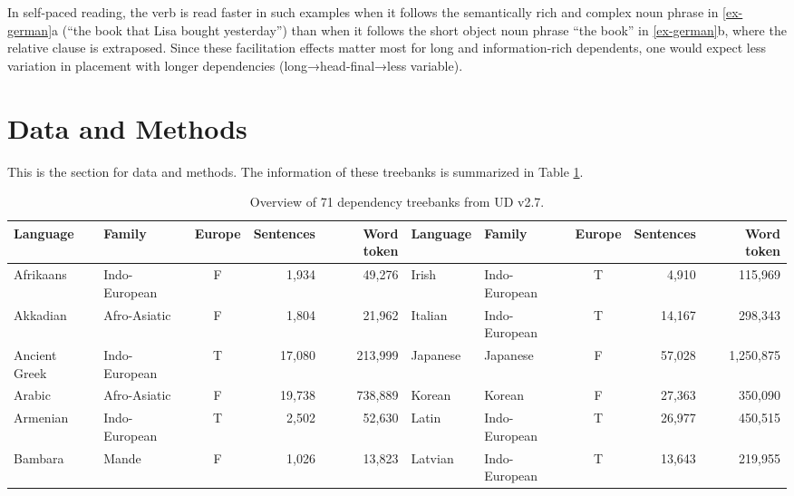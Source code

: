 \documentclass[10pt,a4paper,]{article}
\begin{document}
In self-paced reading, the verb is read faster in such examples when it
follows the semantically rich and complex noun phrase in
\ref{ex-german}a (``the book that Lisa bought yesterday'') than when it
follows the short object noun phrase ``the book'' in \ref{ex-german}b,
where the relative clause is extraposed. Since these facilitation
effects matter most for long and information-rich dependents, one would
expect less variation in placement with longer dependencies
(long→head-final→less variable).

\hypertarget{data-and-methods}{%
\section{Data and Methods}\label{data-and-methods}}

This is the section for data and methods. The information of these
treebanks is summarized in Table \ref{tab:UD-data}.

\begin{center}
\setlength\tabcolsep{2pt}
\begin{ThreePartTable}
\footnotesize
\begin{longtable}[h]{llcrr|llcrr}
\caption{Overview of 71 dependency treebanks from UD v2.7.\label{tab:UD-data}} \\
\hline
\endfirsthead
\toprule
\endhead
\vspace{-0.05cm}
Language & Family & Europe & Sentences & Word token & Language & Family & Europe & Sentences & Word token\\
\midrule
Afrikaans & Indo-European & F & 1,934 & 49,276 & Irish & Indo-European & T & 4,910 & 115,969\\
Akkadian & Afro-Asiatic & F & 1,804 & 21,962 & Italian & Indo-European & T & 14,167 & 298,343\\
Ancient Greek & Indo-European & T & 17,080 & 213,999 & Japanese & Japanese & F & 57,028 & 1,250,875\\
Arabic & Afro-Asiatic & F & 19,738 & 738,889 & Korean & Korean & F & 27,363 & 350,090\\
Armenian & Indo-European & T & 2,502 & 52,630 & Latin & Indo-European & T & 26,977 & 450,515\\
Bambara & Mande & F & 1,026 & 13,823 & Latvian & Indo-European & T & 13,643 & 219,955\\
\bottomrule
\end{longtable}
\end{ThreePartTable}
\end{center}
\end{document}
